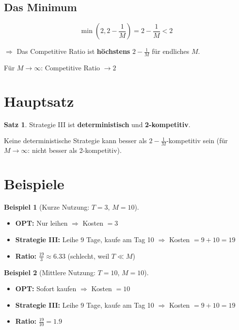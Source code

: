 \documentclass[12pt,a4paper]{article}
\theoremstyle{definition}
\newtheorem{satz}{Satz}
\newtheorem{beispiel}{Beispiel}
\begin{document}
\subsection{Das Minimum}

\[
\min\left(2, 2-\frac{1}{M}\right) = 2 - \frac{1}{M} < 2
\]

$\Rightarrow$ Das Competitive Ratio ist \textbf{höchstens} $2 - \frac{1}{M}$ für endliches $M$.

Für $M \to \infty$: Competitive Ratio $\to 2$

\section{Hauptsatz}

\begin{satz}
Strategie III ist \textbf{deterministisch} und \textbf{2-kompetitiv}.

Keine deterministische Strategie kann besser als $2-\frac{1}{M}$-kompetitiv sein (für $M \to \infty$: nicht besser als 2-kompetitiv).
\end{satz}

\section{Beispiele}

\begin{beispiel}[Kurze Nutzung: $T = 3$, $M = 10$]
\begin{itemize}
    \item \textbf{OPT:} Nur leihen $\Rightarrow$ Kosten $= 3$
    \item \textbf{Strategie III:} Leihe 9 Tage, kaufe am Tag 10 $\Rightarrow$ Kosten $= 9 + 10 = 19$
    \item \textbf{Ratio:} $\displaystyle\frac{19}{3} \approx 6.33$ (schlecht, weil $T \ll M$)
\end{itemize}
\end{beispiel}

\begin{beispiel}[Mittlere Nutzung: $T = 10$, $M = 10$]
\begin{itemize}
    \item \textbf{OPT:} Sofort kaufen $\Rightarrow$ Kosten $= 10$
    \item \textbf{Strategie III:} Leihe 9 Tage, kaufe am Tag 10 $\Rightarrow$ Kosten $= 9 + 10 = 19$
    \item \textbf{Ratio:} $\displaystyle\frac{19}{10} = 1.9$
\end{itemize}
\end{beispiel}
\end{document}
